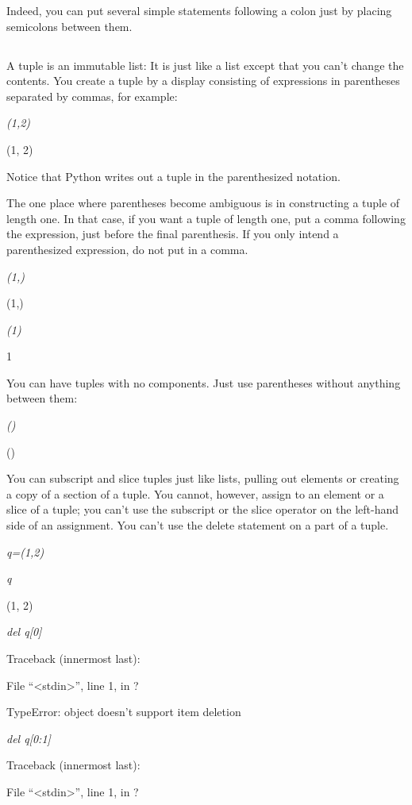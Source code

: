 Indeed, you can put several simple
statements following a colon just by placing semicolons between them.

\subsection[Tuples]{}


A tuple is an immutable list: It is
just like a list except that you can't change the contents. You create a
tuple by a display consisting of expressions in parentheses separated by
commas, for example:


\emph{(1,2)}

(1, 2)

Notice that Python writes out a
tuple in the parenthesized notation.

The one place where parentheses
become ambiguous is in constructing a tuple of length one. In that case,
if you want a tuple of length one, put a comma following the expression,
just before the final parenthesis. If you only intend a parenthesized
expression, do not put in a comma.


\emph{(1,)}

(1,)


\emph{(1)}

1

You can have tuples with no
components. Just use parentheses without anything between them:


\emph{()}

()

You can subscript and slice tuples
just like lists, pulling out elements or creating a copy of a section of
a tuple. You cannot, however, assign to an element or a slice of a
tuple; you can't use the subscript or the slice operator on the
left-hand side of an assignment. You can't use the delete statement on a
part of a tuple.


\emph{q=(1,2)}


\emph{q}

(1, 2)


\emph{del q{[}0{]}}

Traceback (innermost last):

 File
``\textless{}stdin\textgreater{}'', line 1, in ?

TypeError: object doesn't support
item deletion


\emph{del q{[}0:1{]}}

Traceback (innermost last):

 File
``\textless{}stdin\textgreater{}'', line 1, in ?

